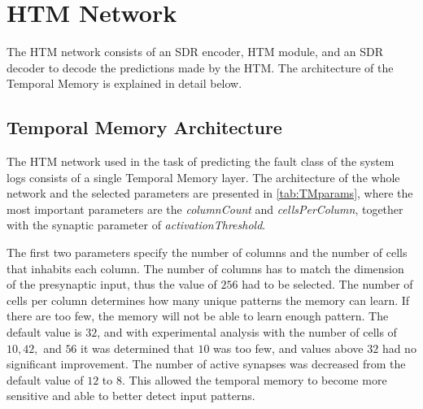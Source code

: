 \section{HTM Network}
The HTM network consists of an SDR encoder, HTM module, and an SDR decoder to decode the predictions made by the HTM. The architecture of the Temporal Memory is explained in detail below.

\subsection{Temporal Memory Architecture}
The HTM network used in the task of predicting the fault class of the system logs consists of a single Temporal Memory layer. The architecture of the whole network and the selected parameters are presented in \autoref{tab:TMparams}, where the most important parameters are the \textit{columnCount} and \textit{cellsPerColumn}, together with the synaptic parameter of \textit{activationThreshold}. 



The first two parameters specify the number of columns and the number of cells that inhabits each column. The number of columns has to match the dimension of the presynaptic input, thus the value of $256$ had to be selected. The number of cells per column determines how many unique patterns the memory can learn. If there are too few, the memory will not be able to learn enough pattern. The default value is $32$, and with experimental analysis with the number of cells of $10,42,$ and $56$ it was determined that $10$ was too few, and values above $32$ had no significant improvement. The number of active synapses was decreased from the default value of $12$ to $8$. This allowed the temporal memory to become more sensitive and able to better detect input patterns.


